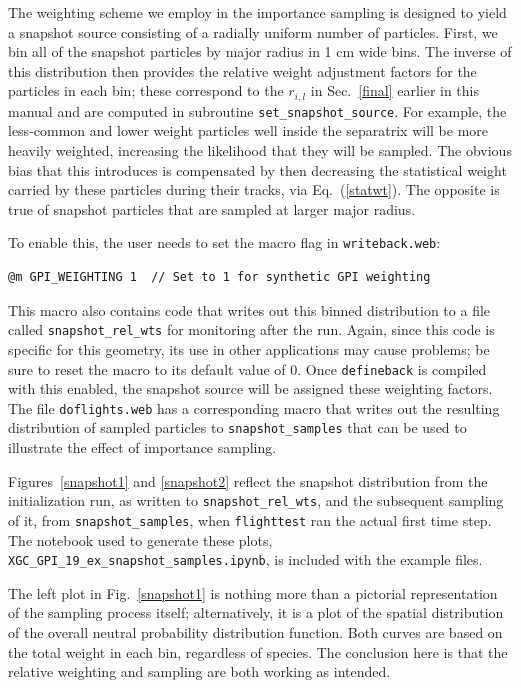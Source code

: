 \documentclass[12pt]{report}
\begin{document}
The weighting scheme we employ in the importance sampling
is designed to yield a snapshot source
consisting of a radially uniform
number of particles. First, we bin all of the snapshot particles
by major radius in 1 cm wide bins. The inverse of this distribution
then provides the relative weight adjustment factors for the particles
in each bin; these correspond to the
$r_{i,l}$ in Sec.~\ref{final} earlier in this
manual and are computed in
subroutine {\tt set\_snapshot\_source}.
For example, the less-common and lower weight particles
well inside the separatrix will be more heavily weighted,
increasing the likelihood that they will be sampled. The obvious
bias that this introduces is compensated by then
decreasing the statistical
weight carried by these particles during their tracks,
via Eq.~(\ref{statwt}). The
opposite is true of snapshot particles that are sampled at larger
major radius.

To enable this, the user needs to set
the macro flag in {\tt writeback.web}:
\begin{verbatim}
@m GPI_WEIGHTING 1  // Set to 1 for synthetic GPI weighting
\end{verbatim}
This macro also contains code that writes out this binned
distribution to a file called {\tt snapshot\_rel\_wts}
for monitoring after the run.
Again, since this code is specific
for this geometry, its use in other applications may cause
problems; be sure to reset the macro to its default value
of $0$.  Once {\tt defineback} is compiled with this
enabled, the snapshot source will be assigned these
weighting factors.
The file {\tt doflights.web} has a corresponding macro
that writes out the resulting distribution of sampled
particles to {\tt snapshot\_samples}
that can be used to illustrate the effect
of importance sampling.  


Figures~\ref{snapshot1} and \ref{snapshot2} reflect
the snapshot distribution from the initialization run,
as written to {\tt snapshot\_rel\_wts}, and the subsequent
sampling of it, from {\tt snapshot\_samples},
when {\tt flighttest} ran the actual
first time step.  The notebook used to generate
these plots, {\tt XGC\_GPI\_19\_ex\_snapshot\_samples.ipynb},
is included with the example files.

The left plot in
Fig.~\ref{snapshot1}
is nothing more than a pictorial representation of the
sampling process itself; alternatively, it is a plot of the spatial
distribution of the overall neutral probability
distribution function.  Both curves are based on the
total weight in each bin, regardless of species.  The conclusion here
is that the relative weighting and sampling are both working as
intended.
\end{document}
